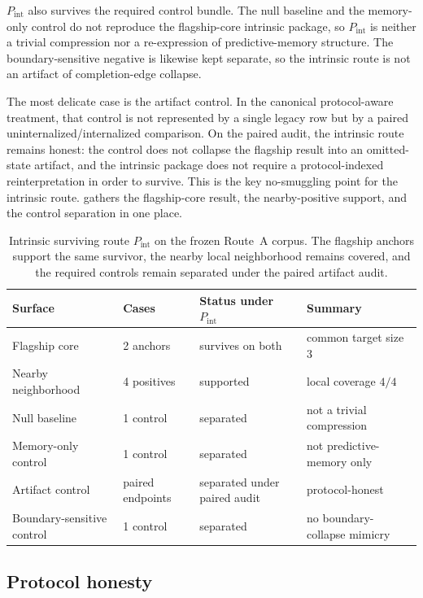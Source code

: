 \documentclass[11pt]{article}
\theoremstyle{definition}
\begin{document}
$P_{\mathrm{int}}$ also survives the required control bundle. The null baseline and the memory-only control do not reproduce the flagship-core intrinsic package, so $P_{\mathrm{int}}$ is neither a trivial compression nor a re-expression of predictive-memory structure. The boundary-sensitive negative is likewise kept separate, so the intrinsic route is not an artifact of completion-edge collapse.

The most delicate case is the artifact control. In the canonical protocol-aware treatment, that control is not represented by a single legacy row but by a paired uninternalized/internalized comparison. On the paired audit, the intrinsic route remains honest: the control does not collapse the flagship result into an omitted-state artifact, and the intrinsic package does not require a protocol-indexed reinterpretation in order to survive. This is the key no-smuggling point for the intrinsic route.  gathers the flagship-core result, the nearby-positive support, and the control separation in one place.

\begin{table}[t]
\centering
\caption{Intrinsic surviving route $P_{\mathrm{int}}$ on the frozen Route~A corpus. The flagship anchors support the same survivor, the nearby local neighborhood remains covered, and the required controls remain separated under the paired artifact audit.}
\label{tab:intrinsic-summary}
\begin{tabularx}{\linewidth}{@{}l l >{\raggedright\arraybackslash}X >{\raggedright\arraybackslash}X@{}}
\hline
Surface & Cases & Status under $P_{\mathrm{int}}$ & Summary \\
\hline
Flagship core & 2 anchors & survives on both & common target size $3$ \\
Nearby neighborhood & 4 positives & supported & local coverage $4/4$ \\
Null baseline & 1 control & separated & not a trivial compression \\
Memory-only control & 1 control & separated & not predictive-memory only \\
Artifact control & paired endpoints & separated under paired audit & protocol-honest \\
Boundary-sensitive control & 1 control & separated & no boundary-collapse mimicry \\
\hline
\end{tabularx}
\end{table}
 
\subsection{Protocol honesty}
\end{document}
